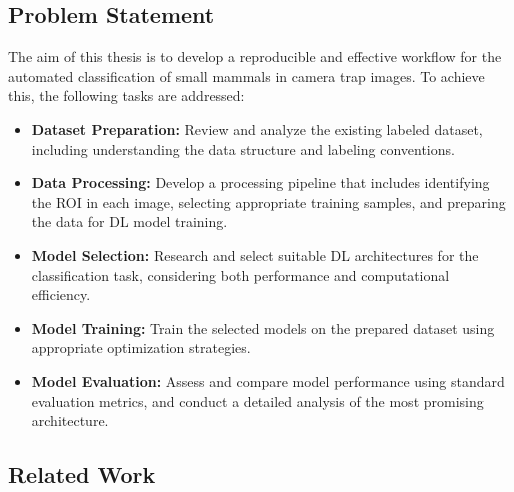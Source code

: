 \subsection{Problem Statement}

The aim of this thesis is to develop a reproducible and effective workflow for the automated classification of small mammals in camera trap images. To achieve this, the following tasks are addressed:

\begin{itemize}
    \item \textbf{Dataset Preparation:} Review and analyze the existing labeled dataset, including understanding the data structure and labeling conventions.
    
    \item \textbf{Data Processing:} Develop a processing pipeline that includes identifying the \ac{ROI} in each image, selecting appropriate training samples, and preparing the data for \ac{DL} model training.
    
    \item \textbf{Model Selection:} Research and select suitable \ac{DL} architectures for the classification task, considering both performance and computational efficiency.
    
    \item \textbf{Model Training:} Train the selected models on the prepared dataset using appropriate optimization strategies.
    
    \item \textbf{Model Evaluation:} Assess and compare model performance using standard evaluation metrics, and conduct a detailed analysis of the most promising architecture.
\end{itemize}


\subsection{Related Work}

